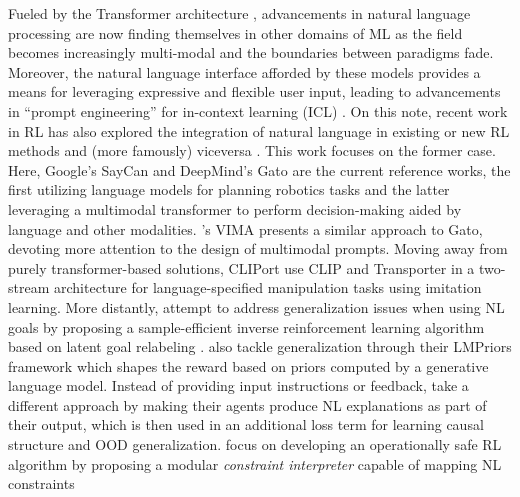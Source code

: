 \documentclass[../thesis-proposal/main.tex]{subfiles}
\begin{document}
Fueled by the Transformer architecture \citep{vaswani_attention_2017}, advancements in natural
language processing \citep{vaswani_attention_2017, devlin_bert_2019, brown_language_2020} are now
finding themselves in other domains of ML \citep{radford_learning_2021,
rombach_high-resolution_2022, dhariwal_jukebox_2020} as the field becomes increasingly multi-modal
\citep{baltrusaitis_multimodal_2019, xu_multimodal_2022} and the boundaries between paradigms fade.
Moreover, the natural language interface afforded by these models provides a means for leveraging
expressive and flexible user input, leading to advancements in ``prompt engineering'' for in-context
learning (ICL) \citep{dohan_language_2022, dosovitskiy_image_2022, reynolds_prompt_2021,
wei_chain--thought_2022, hertz_prompt--prompt_2022}. On this note, recent work in RL has also
explored the integration of natural language in existing or new RL methods
\citep{luketina_survey_2019} and (more famously) viceversa \citep{ouyang_training_2022}. This work
focuses on the former case. Here, Google's SayCan \citep{ahn_as_2022} and DeepMind's Gato
\citep{reed_generalist_2022} are the current reference works, the first utilizing language models
for planning robotics tasks and the latter leveraging a multimodal transformer to perform
decision-making aided by language and other modalities. 's VIMA presents
a similar approach to Gato, devoting more attention to the design of multimodal prompts. Moving away
from purely transformer-based solutions, CLIPort \citep{shridhar_cliport_2021} use CLIP
\citep{radford_learning_2021} and Transporter \citep{zeng_transporter_2021} in a two-stream
architecture for language-specified manipulation tasks using imitation learning. More distantly,
\citet{zhou_inverse_2021} attempt to address generalization issues when using NL goals by proposing
a sample-efficient inverse reinforcement learning algorithm based on latent goal relabeling
\citep{nair_visual_2018}.  also tackle generalization through their
LMPriors framework which shapes the reward \citep{ng_policy_1999} based on priors computed by
a generative language model. Instead of providing input instructions or feedback,
\citet{lampinen_tell_2022} take a different approach by making their agents produce NL explanations
as part of their output, which is then used in an additional loss term for learning causal structure
and OOD generalization.  focus on developing an operationally safe RL
algorithm by proposing a modular \textit{constraint interpreter} capable of mapping NL constraints
\end{document}
